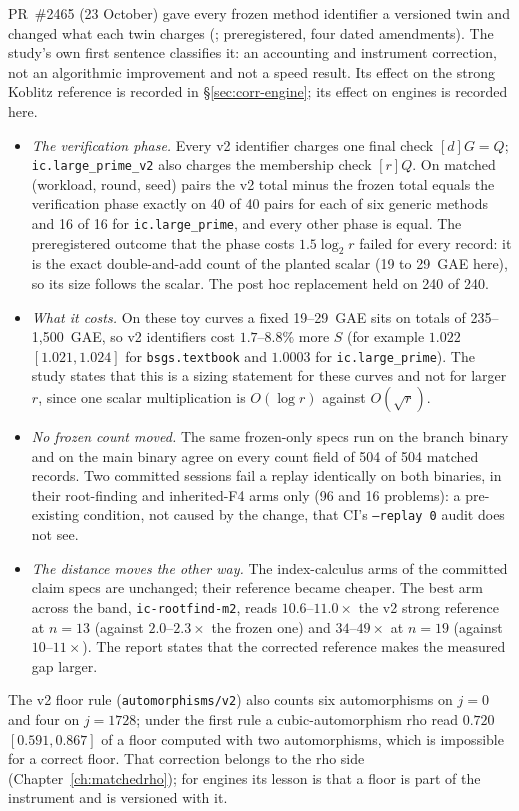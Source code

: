 PR~\#2465 (23 October) gave every frozen method identifier a versioned twin
and changed what each twin charges
(; preregistered,
four dated amendments). The study's own first sentence classifies it: an
accounting and instrument correction, not an algorithmic improvement and
not a speed result. Its effect on the strong Koblitz reference is recorded
in \S\ref{sec:corr-engine}; its effect on engines is recorded here.
\begin{itemize}
\item \emph{The verification phase.} Every v2 identifier charges one final
  check $[d]G=Q$; \texttt{ic.large\_prime\_v2} also charges the membership
  check $[r]Q$. On matched (workload, round, seed) pairs the v2 total
  minus the frozen total equals the verification phase exactly on 40 of 40
  pairs for each of six generic methods and 16 of 16 for
  \texttt{ic.large\_prime}, and every other phase is equal. The
  preregistered outcome that the phase costs $1.5\log_2r$ failed for every
  record: it is the exact double-and-add count of the planted scalar
  (19 to 29~GAE here), so its size follows the scalar. The post hoc
  replacement held on 240 of 240.
\item \emph{What it costs.} On these toy curves a fixed 19--29~GAE sits on
  totals of 235--1{,}500~GAE, so v2 identifiers cost $1.7$--$8.8\%$ more
  $S$ (for example $1.022$ $[1.021,1.024]$ for \texttt{bsgs.textbook} and
  $1.0003$ for \texttt{ic.large\_prime}). The study states that this is a
  sizing statement for these curves and not for larger $r$, since one
  scalar multiplication is $O(\log r)$ against $O(\sqrt r)$.
\item \emph{No frozen count moved.} The same frozen-only specs run on the
  branch binary and on the main binary agree on every count field of
  504 of 504 matched records. Two committed sessions fail a replay
  identically on both binaries, in their root-finding and inherited-F4
  arms only (96 and 16 problems): a pre-existing condition, not caused by
  the change, that CI's \texttt{--replay 0} audit does not see.
\item \emph{The distance moves the other way.} The index-calculus arms of
  the committed claim specs are unchanged; their reference became cheaper.
  The best arm across the band, \texttt{ic-rootfind-m2}, reads
  $10.6$--$11.0\times$ the v2 strong reference at $n=13$ (against
  $2.0$--$2.3\times$ the frozen one) and $34$--$49\times$ at $n=19$
  (against $10$--$11\times$). The report states that the corrected
  reference makes the measured gap larger.
\end{itemize}
The v2 floor rule (\texttt{automorphisms/v2}) also counts six automorphisms
on $j=0$ and four on $j=1728$; under the first rule a cubic-automorphism
rho read $0.720$ $[0.591,0.867]$ of a floor computed with two automorphisms,
which is impossible for a correct floor. That correction belongs to the rho
side (Chapter~\ref{ch:matchedrho}); for engines its lesson is that a floor
is part of the instrument and is versioned with it.

